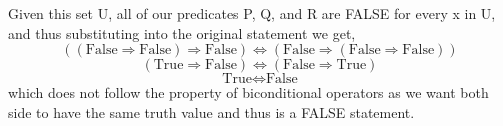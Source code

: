 \documentclass[20pt]{article}
\begin{document}
\begin{enumerate}
Given this set U, all of our predicates P, Q, and R are FALSE for every x in U, and thus substituting into the original statement we get, 
\[((\text{False} \Rightarrow \text{False}) \Rightarrow \text{False}) \Leftrightarrow (\text{False} \Rightarrow (\text{False} \Rightarrow \text{False}))\]
\[(\text{True} \Rightarrow \text{False})  \Leftrightarrow (\text{False} \Rightarrow \text{True})\]
\[\text{True} \Leftrightarrow \text{False}\]
which does not follow the property of biconditional operators as we want both side to have the same truth value and thus is a FALSE statement.

\end{enumerate}
\end{document}
